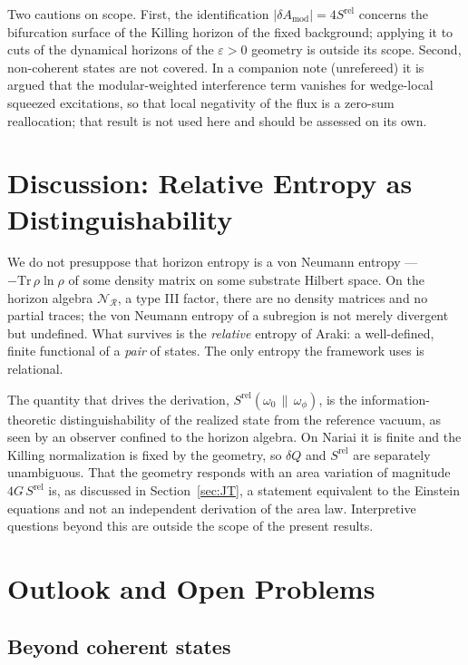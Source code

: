 \documentclass[11pt]{article}
\newcommand{\Srel}{S^{\mathrm{rel}}}
\begin{document}
Two cautions on scope. First, the identification $|\delta A_{\mathrm{mod}}|=4\Srel$ concerns the bifurcation surface of the Killing horizon of the fixed background; applying it to cuts of the dynamical horizons of the $\varepsilon>0$ geometry is outside its scope. Second, non-coherent states are not covered. In a companion note \cite{SuppNariai} (unrefereed) it is argued that the modular-weighted interference term vanishes for wedge-local squeezed excitations, so that local negativity of the flux is a zero-sum reallocation; that result is not used here and should be assessed on its own.

\section{Discussion: Relative Entropy as Distinguishability}
\label{sec:discussion}

We do not presuppose that horizon entropy is a von Neumann entropy --- $-\mathrm{Tr}\,\rho\ln\rho$ of some density matrix on some substrate Hilbert space. On the horizon algebra $\mathscr{N}_{\mathcal{R}}$, a type III factor, there are no density matrices and no partial traces; the von Neumann entropy of a subregion is not merely divergent but undefined. What survives is the \emph{relative} entropy of Araki: a well-defined, finite functional of a \emph{pair} of states. The only entropy the framework uses is relational.

The quantity that drives the derivation, $\Srel(\omega_0\,\|\,\omega_\phi)$, is the information-theoretic distinguishability of the realized state from the reference vacuum, as seen by an observer confined to the horizon algebra. On Nariai it is finite and the Killing normalization is fixed by the geometry, so $\delta Q$ and $\Srel$ are separately unambiguous. That the geometry responds with an area variation of magnitude $4G\,\Srel$ is, as discussed in Section~\ref{sec:JT}, a statement equivalent to the Einstein equations and not an independent derivation of the area law. Interpretive questions beyond this are outside the scope of the present results.

\section{Outlook and Open Problems}
\label{sec:outlook}

\subsection{Beyond coherent states}
\end{document}
